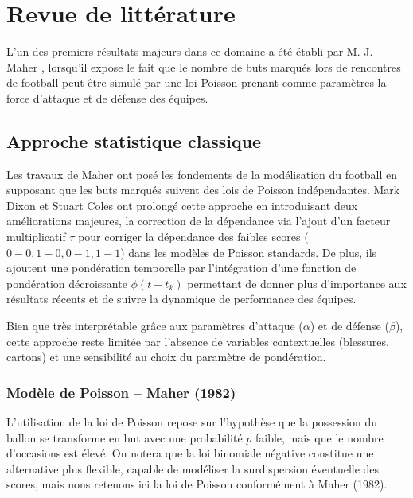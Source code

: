 \section{Revue de littérature}
\label{sec:art}


L'un des premiers résultats majeurs dans ce domaine a été établi par 
M. J. Maher \cite{maher}, lorsqu'il expose le fait que le nombre de buts marqués lors de rencontres 
de football peut être simulé par une loi Poisson prenant comme paramètres la force 
d'attaque et de défense des équipes.

\subsection{Approche statistique classique}

Les travaux de Maher \cite{maher} ont posé les fondements de la modélisation 
du football en supposant que les buts marqués suivent des lois de Poisson 
indépendantes. Mark Dixon et Stuart Coles \cite{dixon} ont prolongé cette approche 
en introduisant deux améliorations majeures, la correction de la dépendance via l'ajout 
d'un facteur multiplicatif $\tau$ pour corriger la dépendance des faibles 
scores ($0-0, 1-0, 0-1, 1-1$) dans les modèles de Poisson standards. De plus, ils ajoutent une 
pondération temporelle par l'intégration d'une fonction de pondération décroissante 
$\phi(t-t_k)$ permettant de donner plus d'importance aux résultats récents et 
de suivre la dynamique de performance des équipes.

\noindent Bien que très interprétable grâce aux paramètres d'attaque ($\alpha$) et de 
défense ($\beta$), cette approche reste limitée par l'absence de variables 
contextuelles (blessures, cartons) et une sensibilité au choix du paramètre de pondération.

\subsubsection{Modèle de Poisson -- Maher (1982)}

L'utilisation de la loi de Poisson repose sur l'hypothèse que la possession 
du ballon se transforme 
en but avec une probabilité $p$ faible, mais que le nombre d'occasions est élevé. 
On notera que la loi binomiale négative constitue une alternative plus flexible, 
capable de modéliser la surdispersion éventuelle des scores, mais nous retenons 
ici la loi de Poisson conformément à Maher (1982)\cite{maher}.\\

